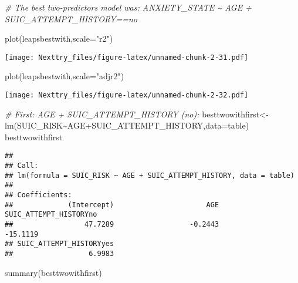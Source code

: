 \documentclass[
]{book}
\newenvironment{Shaded}{\begin{snugshade}}{\end{snugshade}}
\newcommand{\AttributeTok}[1]{\textcolor[rgb]{0.77,0.63,0.00}{#1}}
\newcommand{\CommentTok}[1]{\textcolor[rgb]{0.56,0.35,0.01}{\textit{#1}}}
\newcommand{\FunctionTok}[1]{\textcolor[rgb]{0.00,0.00,0.00}{#1}}
\newcommand{\NormalTok}[1]{#1}
\newcommand{\OtherTok}[1]{\textcolor[rgb]{0.56,0.35,0.01}{#1}}
\newcommand{\SpecialCharTok}[1]{\textcolor[rgb]{0.00,0.00,0.00}{#1}}
\newcommand{\StringTok}[1]{\textcolor[rgb]{0.31,0.60,0.02}{#1}}
\begin{document}
\begin{Shaded}
\begin{Highlighting}[]
\CommentTok{\# The best two{-}predictors model was: ANXIETY\_STATE \textasciitilde{} AGE + SUIC\_ATTEMPT\_HISTORY==no}

\FunctionTok{plot}\NormalTok{(leapsbestwith,}\AttributeTok{scale=}\StringTok{"r2"}\NormalTok{)}
\end{Highlighting}
\end{Shaded}

\texttt{[image: Nexttry\_files/figure-latex/unnamed-chunk-2-31.pdf]}

\begin{Shaded}
\begin{Highlighting}[]
\FunctionTok{plot}\NormalTok{(leapsbestwith,}\AttributeTok{scale=}\StringTok{"adjr2"}\NormalTok{)}
\end{Highlighting}
\end{Shaded}

\texttt{[image: Nexttry\_files/figure-latex/unnamed-chunk-2-32.pdf]}

\begin{Shaded}
\begin{Highlighting}[]
\CommentTok{\# First: AGE + SUIC\_ATTEMPT\_HISTORY (no):}
\NormalTok{besttwowithfirst}\OtherTok{\textless{}{-}}\FunctionTok{lm}\NormalTok{(SUIC\_RISK}\SpecialCharTok{\textasciitilde{}}\NormalTok{AGE}\SpecialCharTok{+}\NormalTok{SUIC\_ATTEMPT\_HISTORY,}\AttributeTok{data=}\NormalTok{table)}
\NormalTok{besttwowithfirst}
\end{Highlighting}
\end{Shaded}

\begin{verbatim}
## 
## Call:
## lm(formula = SUIC_RISK ~ AGE + SUIC_ATTEMPT_HISTORY, data = table)
## 
## Coefficients:
##             (Intercept)                      AGE   SUIC_ATTEMPT_HISTORYno  
##                 47.7289                  -0.2443                 -15.1119  
## SUIC_ATTEMPT_HISTORYyes  
##                  6.9983
\end{verbatim}

\begin{Shaded}
\begin{Highlighting}[]
\FunctionTok{summary}\NormalTok{(besttwowithfirst)}
\end{Highlighting}
\end{Shaded}
\end{document}
